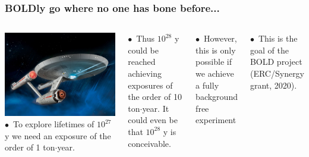 \begin{frame}
\frametitle{BOLDly go where no one has bone before...}
\begin{columns}
\includegraphics[scale=0.09]{img/enterprise.jpg}
$\bullet$~To explore lifetimes of $10^{27}$ y we need an exposure of the order of 1 ton$\cdot$year.

$\bullet$~Thus $10^{28}$ y could be reached achieving exposures of the order of 10 ton$\cdot$year. It could even be that $10^{28}$ y is conceivable. 

$\bullet$~However, this is only possible if we achieve a \alert{fully background free experiment}

$\bullet$~This is the goal of the BOLD project (ERC/Synergy grant, 2020). 

\end{columns}
\end{frame}

